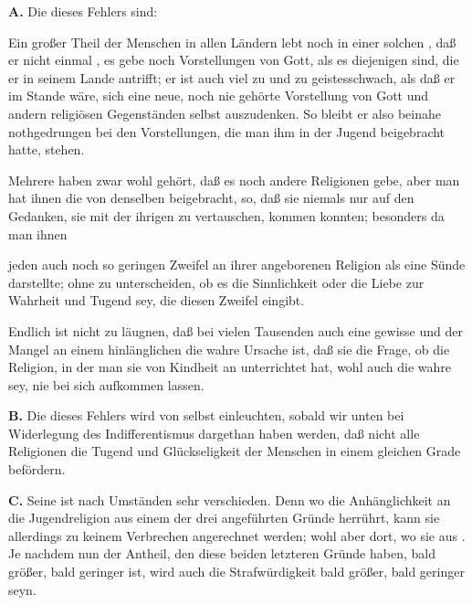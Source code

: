 \indent\textbf{A.} Die  dieses Fehlers sind:
\begin{aufza} 
\item Ein großer Theil der Menschen in allen Ländern lebt noch in einer solchen , daß er nicht einmal , es gebe noch  Vorstellungen von Gott, als es diejenigen sind, die er in seinem Lande antrifft; er ist auch viel zu  und zu geistesschwach, als daß er im Stande wäre, sich eine neue, noch nie gehörte Vorstellung von Gott und andern religiösen Gegenständen selbst auszudenken. So bleibt er also beinahe nothgedrungen bei den Vorstellungen, die man ihm in der Jugend beigebracht hatte, stehen.
\item Mehrere haben zwar wohl gehört, daß es noch andere Religionen gebe, aber man hat ihnen die  von denselben beigebracht, so, daß sie niemals nur auf den Gedanken, sie mit der ihrigen zu vertauschen, kommen konnten; besonders da man ihnen
\item jeden auch noch so geringen Zweifel an ihrer angeborenen Religion als eine Sünde darstellte; ohne zu unterscheiden, ob es die Sinnlichkeit oder die Liebe zur Wahrheit und Tugend sey, die diesen Zweifel eingibt.
\item Endlich ist nicht zu läugnen, daß bei vielen Tausenden auch eine gewisse  und der Mangel an einem hinlänglichen  die wahre Ursache ist, daß sie die Frage, ob die Religion, in der man sie von Kindheit an unterrichtet hat, wohl auch die wahre sey, nie bei sich aufkommen lassen.~
\end{aufza}\par
\vabst\textbf{B.} Die  dieses Fehlers wird von selbst einleuchten, sobald wir unten bei Widerlegung des Indifferentismus dargethan haben werden, daß nicht alle Religionen die Tugend und Glückseligkeit der Menschen in einem gleichen Grade befördern.\par
\vabst\textbf{C.} Seine  ist nach Umständen sehr verschieden. Denn wo die Anhänglichkeit an die Jugendreligion aus einem der drei  angeführten Gründe herrührt, kann sie allerdings zu keinem Verbrechen angerechnet werden; wohl aber dort, wo sie aus . Je nachdem nun der Antheil, den diese beiden letzteren Gründe haben, bald größer, bald geringer ist, wird auch die Strafwürdigkeit bald größer, bald geringer seyn.


